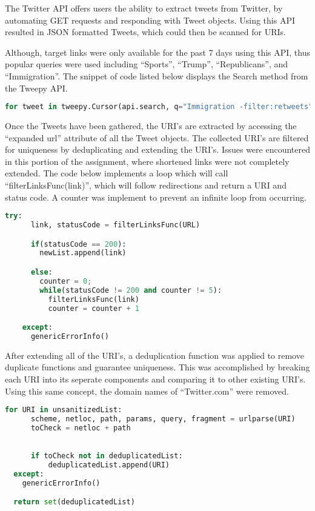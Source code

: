 \documentclass[11pt]{scrartcl} %
\begin{document}
\tabto{2.0cm} The Twitter API offers users the ability to extract tweets from Twitter, by automating GET requests and responding with Tweet objects. Using this API resulted in JSON formatted Tweets, which could then be scanned for URIs.\newline

\tabto{2.0cm} Although, target links were only available for the past 7 days using this API, thus popular queries were used including ``Sports'', ``Trump'', ``Republicans'', and ``Immigration''. The snippet of code listed below displays the Search method from the Tweepy API. 

\begin{lstlisting}[language = Python, caption=Tweepy API Search Method]
for tweet in tweepy.Cursor(api.search, q="Immigration -filter:retweets",count = tweetsCountMax, include_entities=True).items(maxNumTweets):
\end{lstlisting} \bigskip \bigskip

\tabto{2.0cm} Once the Tweets have been gathered, the URI's are extracted by accessing the ``expanded url'' attribute of all the Tweet objects. The collected URI's are filtered for uniqueness by deduplicating and extending the URI's. Issues were encountered in this portion of the assignment, where shortened links were not completely extended. The code below implements a loop which will call ``filterLinksFunc(link)'', which will follow redirections and return a URI and status code. A counter was implement to prevent an infinite loop from occurring.

\begin{lstlisting}[language = Python, caption=Extending URI's]
    try:
      link, statusCode = filterLinksFunc(URL)

      if(statusCode == 200):
        newList.append(link)

      else:
        counter = 0;
        while(statusCode != 200 and counter != 5):
          filterLinksFunc(link)
          counter = counter + 1

    except:
      genericErrorInfo()
\end{lstlisting} \bigskip \bigskip
\pagebreak
\tabto{2.0cm} After extending all of the URI's, a deduplication function was applied to remove duplicate functions and guarantee uniqueness. This was accomplished by breaking each URI into its seperate components and comparing it to other existing URI's. Using this same concept, the domain names of   ``Twitter.com'' were removed.

\begin{lstlisting}[language = Python, caption=Deduplicating URI's]
    for URI in unsanitizedList:
      scheme, netloc, path, params, query, fragment = urlparse(URI)
      toCheck = netloc + path

    
      if toCheck not in deduplicatedList:
          deduplicatedList.append(URI)
  except:
    genericErrorInfo()

  return set(deduplicatedList)
\end{lstlisting} \bigskip \bigskip
\end{document}
